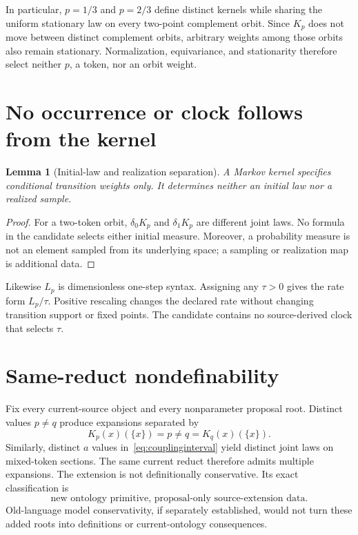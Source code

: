 \documentclass[11pt]{article}
\newtheorem{lemma}{Lemma}
\begin{document}
In particular, $p=1/3$ and $p=2/3$ define distinct kernels while sharing the
uniform stationary law on every two-point complement orbit. Since $K_p$ does
not move between distinct complement orbits, arbitrary weights among those
orbits also remain stationary. Normalization, equivariance, and stationarity
therefore select neither $p$, a token, nor an orbit weight.

\section{No occurrence or clock follows from the kernel}

\begin{lemma}[Initial-law and realization separation]
A Markov kernel specifies conditional transition weights only. It determines
neither an initial law nor a realized sample.
\end{lemma}

\begin{proof}
For a two-token orbit, $\delta_0K_p$ and $\delta_1K_p$ are different joint
laws. No formula in the candidate selects either initial measure. Moreover, a
probability measure is not an element sampled from its underlying space; a
sampling or realization map is additional data.
\end{proof}

Likewise $L_p$ is dimensionless one-step syntax. Assigning any $\tau>0$ gives
the rate form $L_p/\tau$. Positive rescaling changes the declared rate without
changing transition support or fixed points. The candidate contains no
source-derived clock that selects $\tau$.

\section{Same-reduct nondefinability}

Fix every current-source object and every nonparameter proposal root. Distinct
values $p\ne q$ produce expansions separated by
\[
  K_p(x)(\{x\})=p\ne q=K_q(x)(\{x\}).
\]
Similarly, distinct $a$ values in~\eqref{eq:couplinginterval} yield distinct
joint laws on mixed-token sections. The same current reduct therefore admits
multiple expansions. The extension is not definitionally conservative. Its
exact classification is
\[
  \boxed{\text{new ontology primitive, proposal-only source-extension data}}.
\]
Old-language model conservativity, if separately established, would not turn
these added roots into definitions or current-ontology consequences.
\end{document}

